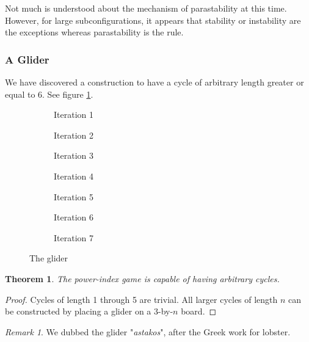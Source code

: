 \documentclass[12pt]{article}
\newtheorem{theorem}{Theorem}%
\theoremstyle{definition}
\theoremstyle{remark}
\newtheorem{remark}{Remark}%
\theoremstyle{remark}
\begin{document}
\par
Not much is understood about the mechanism of parastability at this time. However, for large subconfigurations, it appears that stability or instability are the exceptions whereas parastability is the rule.

\subsubsection{A Glider} \label{Astakos}
\par
We have discovered a construction to have a cycle of arbitrary length greater or equal to 6. See figure \ref{Astakos}.


\begin{figure}
  \centering
  \begin{subfigure}[b]{0.25\linewidth}
    \caption{Iteration 1}
  \end{subfigure}
  \begin{subfigure}[b]{0.25\linewidth}
    \caption{Iteration 2}
  \end{subfigure}
  \begin{subfigure}[b]{0.25\linewidth}
    \caption{Iteration 3}
  \end{subfigure}
  \begin{subfigure}[b]{0.25\linewidth}
    \caption{Iteration 4}
  \end{subfigure}
  \begin{subfigure}[b]{0.25\linewidth}
    \caption{Iteration 5}
  \end{subfigure}
  \begin{subfigure}[b]{0.25\linewidth}
    \caption{Iteration 6}
  \end{subfigure}
  \begin{subfigure}[b]{0.25\linewidth}
    \caption{Iteration 7}
  \end{subfigure}
  \caption{The glider}
  \label{Astakos}
\end{figure}

\begin{theorem}
The power-index game is capable of having arbitrary cycles.
\end{theorem}
\begin{proof}
Cycles of length 1 through 5 are trivial. All larger cycles of length $n$ can be constructed by placing a glider on a $3$-by-$n$ board.
\end{proof}
\begin{remark}
We dubbed the glider "\textit{astakos}", after the Greek work for lobster.
\end{remark}
\end{document}
